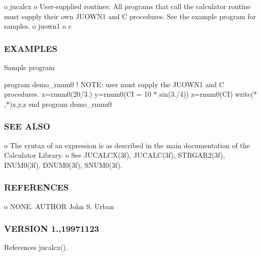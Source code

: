 o jucalcx o User-\/supplied routines\+: All programs that call the calculator routine must supply their own J\+U\+O\+W\+N1 and C procedures. See the example program for samples. o juown1 o c \subsubsection*{E\+X\+A\+M\+P\+L\+ES}

Sample program

program demo\+\_\+rnum0 ! N\+O\+TE\+: user must supply the J\+U\+O\+W\+N1 and C procedures. x=rnum0(\textquotesingle{}20/3.\textquotesingle{}) y=rnum0(\textquotesingle{}CI = 10 $\ast$ sin(3./4)\textquotesingle{}) z=rnum0(\textquotesingle{}CI\textquotesingle{}) write($\ast$,$\ast$)x,y,z end program demo\+\_\+rnum0

\subsubsection*{S\+EE A\+L\+SO}

\begin{DoxyVerb}   o The syntax of an expression is as described in the main documentation
     of the Calculator Library.
   o See JUCALCX(3f), JUCALC(3f), STRGAR2(3f), INUM0(3f), DNUM0(3f), SNUM0(3f).
\end{DoxyVerb}


\subsubsection*{R\+E\+F\+E\+R\+E\+N\+C\+ES}

o N\+O\+NE. A\+U\+T\+H\+OR John S. Urban \subsubsection*{V\+E\+R\+S\+I\+ON 1.,19971123}

References jucalcx().

